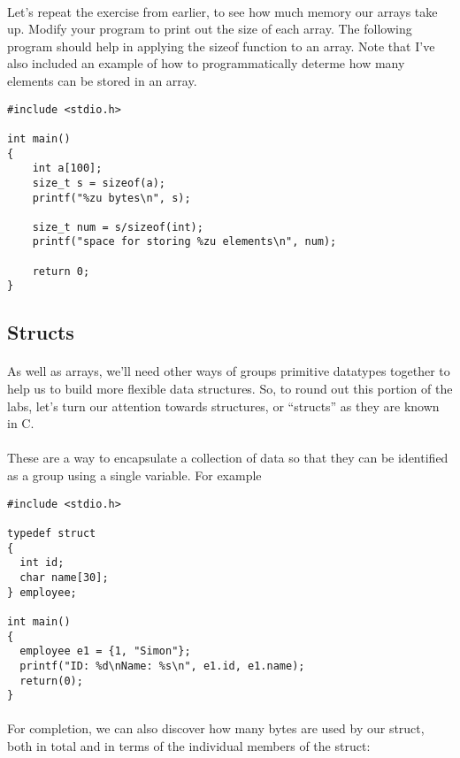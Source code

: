 \documentclass[10pt, a4paper, twosize]{article}
\begin{document}
\paragraph{} Let's repeat the exercise from earlier, to see how much memory our arrays take up. Modify your program to print out the size of each array. The following program should help in applying the sizeof function to an array. Note that I've also included an example of how to programmatically determe how many elements can be stored in an array.

\begin{lstlisting}
#include <stdio.h>

int main()
{
    int a[100];
    size_t s = sizeof(a);
    printf("%zu bytes\n", s);

    size_t num = s/sizeof(int);
    printf("space for storing %zu elements\n", num);

    return 0;
}
\end{lstlisting}

\subsection{Structs}
\paragraph{} As well as arrays, we'll need other ways of groups primitive datatypes together to help us to build more flexible data structures. So, to round out this portion of the labs, let's turn our attention towards structures, or ``structs'' as they are known in C.

\paragraph{} These are a way to encapsulate a collection of data so that they can be identified as a group using a single variable. For example

\begin{lstlisting}
#include <stdio.h>    

typedef struct
{
  int id;
  char name[30];  
} employee;

int main()
{
  employee e1 = {1, "Simon"};
  printf("ID: %d\nName: %s\n", e1.id, e1.name);
  return(0);
}
\end{lstlisting}

\paragraph{} For completion, we can also discover how many bytes are used by our struct, both in total and in terms of the individual members of the struct:
\end{document}
